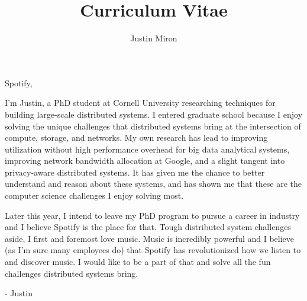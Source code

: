 \documentclass[10pt]{article}
\title{Curriculum Vitae}
\author{Justin Miron}
\begin{document}
\noindent Spotify,
\vspace{0.1in}

I’m Justin, a PhD student at Cornell University researching techniques for building large-scale distributed systems. I entered graduate school because I enjoy solving the unique challenges that distributed systems bring at the intersection of compute, storage, and networks. My own research has lead to improving utilization without high performance overhead for big data analytical systems, improving network bandwidth allocation at Google, and a slight tangent into privacy-aware distributed systems. It has given me the chance to better understand and reason about these systems, and has shown me that these are the computer science challenges I enjoy solving most.
\vspace{0.1in}

Later this year, I intend to leave my PhD program to pursue a career in industry and I believe Spotify is the place for that. Tough distributed system challenges aside, I first and foremost love music. Music is incredibly powerful and I believe (as I’m sure many employees do) that Spotify has revolutionized how we listen to and discover music. I would like to be a part of that and solve all the fun challenges distributed systems bring.

\vspace{0.1in}
- Justin
\end{document}
